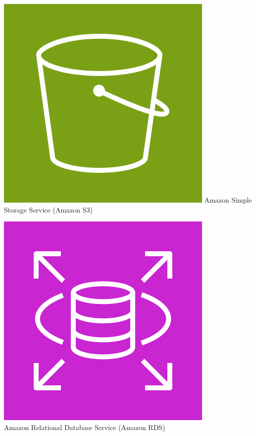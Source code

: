\begin{frame}[t]{\ftitle}
\begin{minipage}{\textwidth}
\begin{minipage}[t]{.32\textwidth}
            \includegraphics[keepaspectratio,width=\textwidth]{Arch_Amazon-Simple-Storage-Service_64@5x.png}
            {\tiny Amazon Simple Storage Service (Amazon S3)\cite{aws}}
        \end{minipage}
        \begin{minipage}[t]{.32\textwidth}
            \centering
            \includegraphics[keepaspectratio,width=\textwidth]{Arch_Amazon-RDS_64@5x.png}\\
            {\tiny Amazon Relational Database Service (Amazon RDS)\cite{aws}}
        \end{minipage}
    \end{minipage}
\end{frame}
